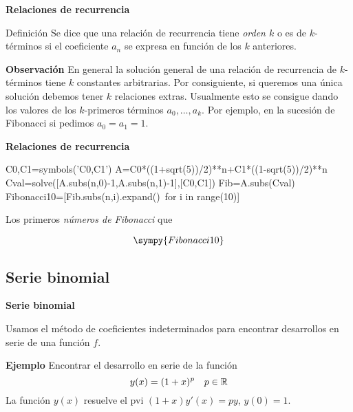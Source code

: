  \begin{frame}[fragile]{\textbf{Relaciones de recurrencia}}

\begin{block}{Definición}
 Se dice que una relación de recurrencia tiene \emph{orden $k$} o es de $k$-términos si el coeficiente $a_n$ se expresa en función de los $k$  anteriores. 
\end{block}

\textbf{Observación }  En general la solución general de una relación de recurrencia de $k$-términos tiene $k$ constantes arbitrarias. Por consiguiente, si queremos una única solución debemos tener $k$ relaciones extras. Usualmente esto se consigue dando los valores de los $k$-primeros términos $a_0,\ldots,a_k$. Por ejemplo, en  la sucesión de Fibonacci si pedimos $a_0=a_1=1$.


\end{frame}



 \begin{frame}[fragile]{\textbf{Relaciones de recurrencia}}
\begin{sympyblock}[][numbers=left,frame=single,framesep=5mm]
C0,C1=symbols('C0,C1')
A=C0*((1+sqrt(5))/2)**n+C1*((1-sqrt(5))/2)**n
Cval=solve([A.subs(n,0)-1,A.subs(n,1)-1],[C0,C1])
Fib=A.subs(Cval)
Fibonacci10=[Fib.subs(n,i).expand()\
    for i in range(10)]
\end{sympyblock}


Los primeros \emph{números de Fibonacci} que

\[ \sympy{Fibonacci10}\]

\end{frame}




\subsection{Serie binomial}
 \begin{frame}[fragile]{\textbf{Serie binomial}}
 
 
Usamos  el método de coeficientes indeterminados para encontrar desarrollos en serie de una función  $f$.

\textbf{Ejemplo }  Encontrar el desarrollo en serie de la función
\[y(x)=(1+x)^p\quad p\in\mathbb{R}\]
La función $y(x)$ resuelve el pvi  $(1+x)y'(x)=py$, $y(0)=1$. 



\end{frame}




